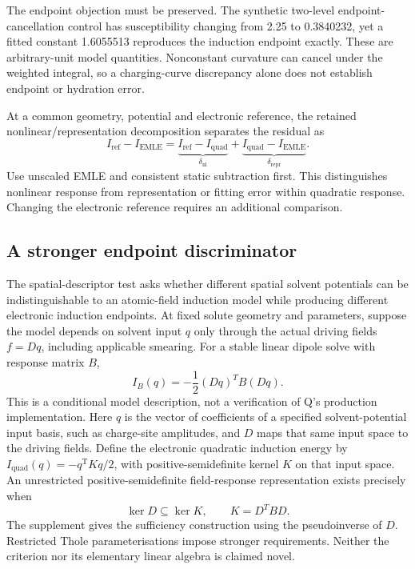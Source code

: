 \documentclass{article}
\begin{document}
The endpoint objection must be preserved. The synthetic two-level endpoint-cancellation control has susceptibility changing from 2.25 to 0.3840232, yet a fitted constant 1.6055513 reproduces the induction endpoint exactly. These are arbitrary-unit model quantities. Nonconstant curvature can cancel under the weighted integral, so a charging-curve discrepancy alone does not establish endpoint or hydration error.

At a common geometry, potential and electronic reference, the retained nonlinear/representation decomposition separates the residual as
\begin{equation*}
I_{\mathrm{ref}}-I_{\mathrm{EMLE}}=
\underbrace{I_{\mathrm{ref}}-I_{\mathrm{quad}}}_{\delta_{\mathrm{nl}}}
+\underbrace{I_{\mathrm{quad}}-I_{\mathrm{EMLE}}}_{\delta_{\mathrm{repr}}}.
\end{equation*}
Use unscaled EMLE and consistent static subtraction first. This distinguishes nonlinear response from representation or fitting error within quadratic response. Changing the electronic reference requires an additional comparison.

\subsection{A stronger endpoint discriminator}

The spatial-descriptor test asks whether different spatial solvent potentials can be indistinguishable to an atomic-field induction model while producing different electronic induction endpoints. At fixed solute geometry and parameters, suppose the model depends on solvent input $q$ only through the actual driving fields $f=Dq$, including applicable smearing. For a stable linear dipole solve with response matrix $B$,
\begin{equation*}
I_B(q)=-\frac12(Dq)^TB(Dq).
\end{equation*}
This is a conditional model description, not a verification of Q's production implementation. Here $q$ is the vector of coefficients of a specified solvent-potential input basis, such as charge-site amplitudes, and $D$ maps that same input space to the driving fields. Define the electronic quadratic induction energy by $I_{\mathrm{quad}}(q)=-q^{\mathrm T}Kq/2$, with positive-semidefinite kernel $K$ on that input space. An unrestricted positive-semidefinite field-response representation exists precisely when
\begin{equation*}
\operatorname{ker}D\subseteq\operatorname{ker}K,\qquad K=D^TBD.
\end{equation*}
The supplement gives the sufficiency construction using the pseudoinverse of $D$. Restricted Thole parameterisations impose stronger requirements. Neither the criterion nor its elementary linear algebra is claimed novel.
\end{document}

